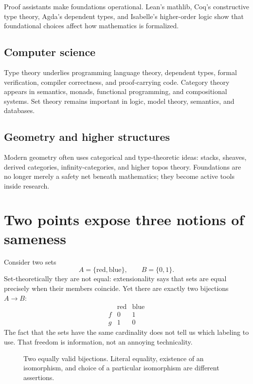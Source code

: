 Proof assistants make foundations operational.  Lean's mathlib, Coq's constructive type theory, Agda's dependent types, and Isabelle's higher-order logic show that foundational choices affect how mathematics is formalized.

\subsection{Computer science}

Type theory underlies programming language theory, dependent types, formal verification, compiler correctness, and proof-carrying code.  Category theory appears in semantics, monads, functional programming, and compositional systems.  Set theory remains important in logic, model theory, semantics, and databases.

\subsection{Geometry and higher structures}

Modern geometry often uses categorical and type-theoretic ideas: stacks, sheaves, derived categories, infinity-categories, and higher topos theory.  Foundations are no longer merely a safety net beneath mathematics; they become active tools inside research.

\section{Two points expose three notions of sameness}

Consider two sets
\[
 A=\{\mathrm{red},\mathrm{blue}\},\qquad B=\{0,1\}.
\]
Set-theoretically they are not equal: extensionality says that sets are equal precisely when their members coincide. Yet there are exactly two bijections $A\to B$:
\[
 \begin{array}{c|cc}
 &\mathrm{red}&\mathrm{blue}\\\hline
 f&0&1\\
 g&1&0
 \end{array}
\]
The fact that the sets have the same cardinality does not tell us which labeling to use. That freedom is information, not an annoying technicality.

\begin{figure}[H]
\centering
{}
\caption{Two equally valid bijections. Literal equality, existence of an isomorphism, and choice of a particular isomorphism are different assertions.}
\end{figure}

